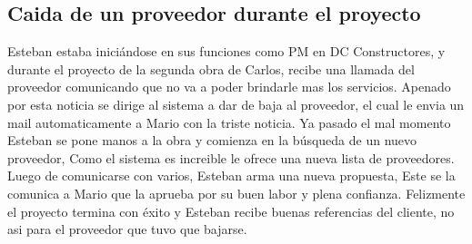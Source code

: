 \subsection{Caida de un proveedor durante el proyecto} 
Esteban estaba iniciándose en sus funciones como PM en DC Constructores, y durante el proyecto de la segunda obra de Carlos, recibe una llamada del proveedor 
comunicando que no va a poder brindarle mas los servicios. Apenado por esta noticia se dirige al sistema a dar de baja al proveedor,
el cual le envia un mail automaticamente a Mario con la triste noticia. Ya pasado el mal momento Esteban se pone manos a la obra y comienza en la búsqueda 
de un nuevo proveedor, Como el sistema es increible le ofrece una nueva lista de proveedores.
Luego de comunicarse con varios, Esteban arma una nueva propuesta, Este se la comunica a Mario que la aprueba por su buen labor y plena confianza. Felizmente el proyecto termina con éxito y Esteban recibe buenas referencias del cliente, no asi para el proveedor que tuvo que bajarse.


